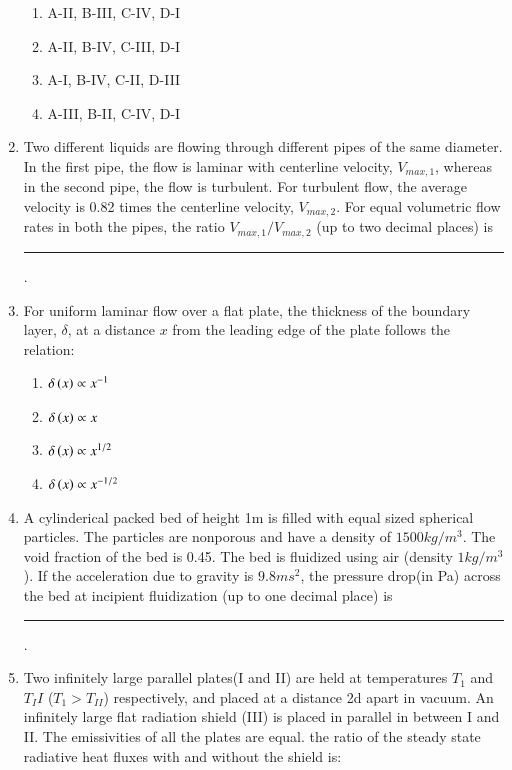\documentclass[journal,12pt,onecolumn]{IEEEtran}
\theoremstyle{remark}
\begin{document}
\begin{enumerate}
\begin{enumerate}
    \item A-II, B-III, C-IV, D-I 
     \item A-II, B-IV, C-III, D-I 
      \item A-I, B-IV, C-II, D-III 
       \item A-III, B-II, C-IV, D-I 
\end{enumerate}

    \item Two different liquids are flowing through different pipes of the same diameter. In the first pipe, the flow is laminar with centerline velocity, $V_{max,1}$, whereas in the second pipe, the flow is turbulent. For turbulent flow, the average velocity is 0.82 times the centerline velocity, $V_{max,2}$. For equal volumetric flow rates in both the pipes, the ratio $V_{max,1}/V_{max,2}$ (up to two decimal places) is \rule{40pt}{0.1mm}.

\hfill{}
    \item For uniform laminar flow over a flat plate, the thickness of the boundary layer, $\delta$, at a distance $x$ from the leading edge of the plate follows the relation:

\hfill{}
\begin{enumerate}
    \item $\delta \left(x\right) \propto x^{-1}$
     \item $\delta \left(x\right) \propto x$
      \item $\delta \left(x\right) \propto x^{1/2}$
       \item $\delta \left(x\right) \propto x^{-1/2}$
\end{enumerate}

    \item A cylinderical packed bed of height 1m is filled with equal sized spherical particles. The particles are nonporous and have a density of $1500 kg/m^3$. The void fraction of the bed is 0.45. The bed is fluidized using air (density $1kg/m^3$). If the acceleration due to gravity is $9.8 ms^2$, the pressure drop(in Pa) across the bed at incipient fluidization (up to one decimal place) is \rule{40pt}{0.1mm}.

\hfill{}
    \item Two infinitely large parallel plates(I and II) are held at temperatures $T_1$ and $T_II$ ($T_1 > T_{II}$) respectively, and placed at a distance 2d apart in vacuum. An infinitely large flat radiation shield (III) is placed in parallel in between I and II. The emissivities of all the plates are equal. the ratio of the steady state radiative heat fluxes with and without the shield is:


\end{enumerate}
\end{document}
